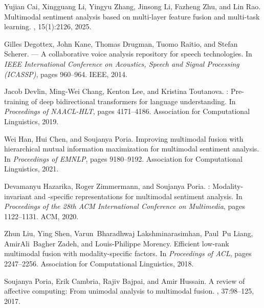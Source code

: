 \documentclass[11pt,twocolumn]{article}
\begin{document}
\begin{thebibliography}{}

Yujian Cai, Xingguang Li, Yingyu Zhang, Jinsong Li, Fazheng Zhu, and Lin Rao.
\newblock Multimodal sentiment analysis based on multi-layer feature fusion and
  multi-task learning.
, 15(1):2126, 2025.

Gilles Degottex, John Kane, Thomas Drugman, Tuomo Raitio, and Stefan Scherer.
 --- {A} collaborative voice analysis repository for speech
  technologies.
\newblock In {\em IEEE International Conference on Acoustics, Speech and Signal
  Processing (ICASSP)}, pages 960--964. IEEE, 2014.

Jacob Devlin, Ming-Wei Chang, Kenton Lee, and Kristina Toutanova.
: Pre-training of deep bidirectional transformers for language
  understanding.
\newblock In {\em Proceedings of NAACL-HLT}, pages 4171--4186. Association for
  Computational Linguistics, 2019.

Wei Han, Hui Chen, and Soujanya Poria.
\newblock Improving multimodal fusion with hierarchical mutual information
  maximization for multimodal sentiment analysis.
\newblock In {\em Proceedings of EMNLP}, pages 9180--9192. Association for
  Computational Linguistics, 2021.

Devamanyu Hazarika, Roger Zimmermann, and Soujanya Poria.
: Modality-invariant and -specific representations for
  multimodal sentiment analysis.
\newblock In {\em Proceedings of the 28th ACM International Conference on
  Multimedia}, pages 1122--1131. ACM, 2020.

Zhun Liu, Ying Shen, Varun~Bharadhwaj Lakshminarasimhan, Paul~Pu Liang,
  AmirAli~Bagher Zadeh, and Louis-Philippe Morency.
\newblock Efficient low-rank multimodal fusion with modality-specific factors.
\newblock In {\em Proceedings of ACL}, pages 2247--2256. Association for
  Computational Linguistics, 2018.

Soujanya Poria, Erik Cambria, Rajiv Bajpai, and Amir Hussain.
\newblock A review of affective computing: From unimodal analysis to multimodal
  fusion.
, 37:98--125, 2017.


\end{thebibliography}
\end{document}
